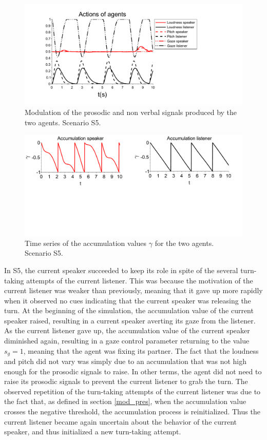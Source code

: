 \begin{figure}
  \centering
  \includegraphics[width=\linewidth]{figure/emerg_sc2.pdf}
  \caption{Modulation of the prosodic and non verbal signals produced by the two agents. Scenario S5.}
  \label{simu_buttin}
\end{figure}

\begin{figure}
  \centering
  \includegraphics[width=\linewidth]{figure/acc_sc2_small.pdf}
  \caption{Time series of the accumulation values $\gamma$ for the two agents. Scenario S5.}
  \label{acc_buttin}
\end{figure}

In S5, the current speaker succeeded to keep its role in spite of the several turn-taking attempts of the current listener. This was because the motivation of the current listener was weaker than previously, meaning that it gave up more rapidly when it observed no cues indicating that the current speaker was releasing the turn. At the beginning of the simulation, the accumulation value of the current speaker raised, resulting in a current speaker averting its gaze from the listener. As the current listener gave up, the accumulation value of the current speaker diminished again, resulting in a gaze control parameter returning to the value $s_g=1$, meaning that the agent was fixing its partner. The fact that the loudness and pitch did not vary was simply due to an accumulation that was not high enough for the prosodic signals to raise. In other terms, the agent did not need to raise its prosodic signals to prevent the current listener to grab the turn. The observed repetition of the turn-taking attempts of the current listener was due to the fact that, as defined in section \ref{mod_pres}, when the accumulation value crosses the negative threshold, the accumulation process is reinitialized. Thus the current listener became again uncertain about the behavior of the current speaker, and thus initialized a new turn-taking attempt. 



